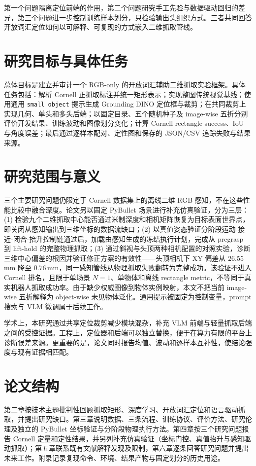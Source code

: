\documentclass{l4proj}
\begin{document}
第一个问题隔离定位前端的作用，第二个问题研究手工先验与数据驱动回归的差异，第三个问题进一步控制训练样本划分，只检验输出头组织方式。三者共同回答开放词汇定位如何以可解释、可复现的方式嵌入二维抓取管线。

\section{研究目标与具体任务}
总体目标是建立并审计一个 RGB-only 的开放词汇辅助二维抓取实验框架。具体任务包括：解析 Cornell 正抓取标注并统一矩形表示；实现整图传统视觉基线；使用通用 \texttt{small object} 提示生成 Grounding DINO 定位框与裁剪；在共同裁剪上实现几何、单头和多头后端；以固定目录、五个随机种子及 image-wise 五折分别评价开发结果、训练波动和图像划分变化；计算 Cornell rectangle success、IoU 与角度误差；最后通过逐样本配对、定性图和保存的 JSON/CSV 追踪失败与结果来源。

\section{研究范围与意义}
三个主要研究问题仍限定于 Cornell 数据集上的离线二维 RGB 感知，不在这些性能比较中融合深度。论文另以固定 PyBullet 场景进行补充仿真验证，分为三层：(1) 检验九个二维抓取中心能否通过米制深度和相机矩阵恢复为目标表面世界点，即关闭从感知输出到三维坐标的数据流缺口；(2) 以真值姿态验证分阶段运动-接近-闭合-抬升控制链通过后，加载由感知生成的冻结执行计划，完成从 pregrasp 到 lift-hold 的完整物理抓取；(3) 通过斜视与头顶两种相机配置的对照实验，诊断三维中心偏差的根因并验证修正方案的有效性——头顶相机下 XY 偏差从 $26.55$\,mm 降至 $0.76$\,mm，同一感知管线从物理抓取失败翻转为完整成功。该验证不进入 Cornell 排名，且限于单场景 $N=1$、单物体和离线 rectangle metric，不等同于真实机器人抓取成功率。由于缺少权威图像到物体实例映射，本文不把当前 image-wise 五折解释为 object-wise 未见物体泛化。通用提示被固定为控制变量，prompt 搜索与 VLM 微调属于后续工作。

学术上，本研究通过共享定位裁剪减少模块混杂，补充 VLM 前端与轻量抓取后端之间的受控证据。工程上，定位器和后端可以独立替换，便于在算力有限的平台上诊断误差来源。更重要的是，论文同时报告均值、波动和逐样本互补性，使结论强度与现有证据相匹配。

\section{论文结构}
第二章按技术主题批判性回顾抓取矩形、深度学习、开放词汇定位和语言驱动抓取，并提出研究缺口。第三章说明数据、三条流程、训练协议、评价方法、研究伦理及独立的 PyBullet 坐标验证与分阶段物理执行方法。第四章按三个研究问题报告 Cornell 定量和定性结果，并另列补充仿真验证（坐标门控、真值抬升与感知驱动抓取）；第五章联系既有文献解释发现及限制，第六章逐条回答研究问题并提出未来工作。附录记录复现命令、环境、结果产物与固定划分的历史用途。
\end{document}
